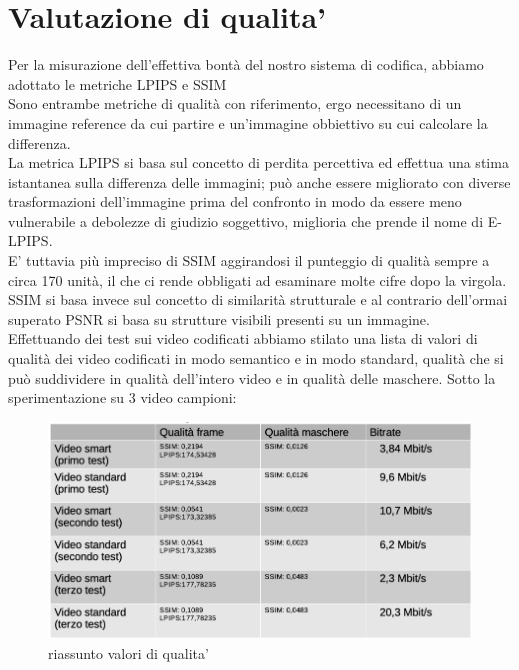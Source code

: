 \chapter{Valutazione di qualita'}
\label{chap:quality}
Per la misurazione dell'effettiva bontà del nostro sistema di codifica, abbiamo adottato le metriche LPIPS e SSIM \\
Sono entrambe metriche di qualità con riferimento, ergo necessitano di un immagine reference da cui partire e un'immagine obbiettivo su cui calcolare la differenza.\\
La metrica LPIPS si basa sul concetto di perdita percettiva ed effettua una stima istantanea sulla differenza delle immagini; può anche essere migliorato con diverse trasformazioni dell'immagine prima del confronto in modo da essere meno vulnerabile a debolezze di giudizio soggettivo, miglioria che prende il nome di E-LPIPS. \\
E' tuttavia più impreciso di SSIM aggirandosi il punteggio di qualità sempre a circa 170 unità, il che ci rende obbligati ad esaminare molte cifre dopo la virgola.\\
SSIM si basa invece sul concetto di similarità strutturale e al contrario dell'ormai superato PSNR si basa su strutture visibili presenti su un immagine. \\
Effettuando dei test sui video codificati abbiamo stilato una lista di valori di qualità dei video codificati in modo semantico e in modo standard, qualità che si può suddividere in qualità dell'intero video e in qualità delle maschere. Sotto la sperimentazione su 3 video campioni:
\begin{figure}
   \includegraphics[width=\linewidth]{images/table.png}
   \caption{riassunto valori di qualita'}
   \label{fig:table}
\end{figure}